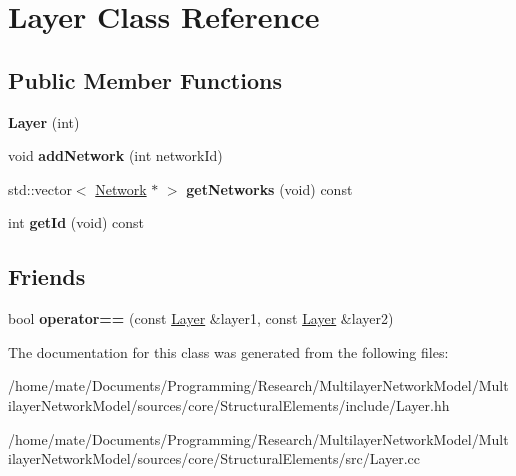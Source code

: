 \hypertarget{classLayer}{}\section{Layer Class Reference}
\label{classLayer}
\subsection*{Public Member Functions}
\begin{DoxyCompactItemize}
\item 
{\bfseries Layer} (int)\hypertarget{classLayer_a3f0552558b7008ebe37b74d55181d2a8}{}\label{classLayer_a3f0552558b7008ebe37b74d55181d2a8}

\item 
void {\bfseries add\+Network} (int network\+Id)\hypertarget{classLayer_ae76589e097e0fc8d3fc0d16c83670a5c}{}\label{classLayer_ae76589e097e0fc8d3fc0d16c83670a5c}

\item 
std\+::vector$<$ \hyperlink{classNetwork}{Network} $\ast$ $>$ {\bfseries get\+Networks} (void) const \hypertarget{classLayer_a7c8fe4f0a91522c0ffbb4b6ed3d507f1}{}\label{classLayer_a7c8fe4f0a91522c0ffbb4b6ed3d507f1}

\item 
int {\bfseries get\+Id} (void) const \hypertarget{classLayer_a00123131915f8bef4bf58bda3229e80c}{}\label{classLayer_a00123131915f8bef4bf58bda3229e80c}

\end{DoxyCompactItemize}
\subsection*{Friends}
\begin{DoxyCompactItemize}
\item 
bool {\bfseries operator==} (const \hyperlink{classLayer}{Layer} \&layer1, const \hyperlink{classLayer}{Layer} \&layer2)\hypertarget{classLayer_aca6ebc1f2e29896977fd9434db21761b}{}\label{classLayer_aca6ebc1f2e29896977fd9434db21761b}

\end{DoxyCompactItemize}


The documentation for this class was generated from the following files\+:\begin{DoxyCompactItemize}
\item 
/home/mate/\+Documents/\+Programming/\+Research/\+Multilayer\+Network\+Model/\+Multilayer\+Network\+Model/sources/core/\+Structural\+Elements/include/Layer.\+hh\item 
/home/mate/\+Documents/\+Programming/\+Research/\+Multilayer\+Network\+Model/\+Multilayer\+Network\+Model/sources/core/\+Structural\+Elements/src/Layer.\+cc\end{DoxyCompactItemize}
